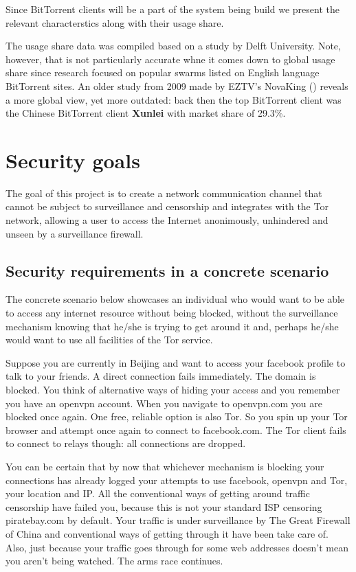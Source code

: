 \documentclass[11pt]{book} %
\begin{document}
Since BitTorrent clients will be a part of the system being build we present the relevant characterstics along with their usage share.

The usage share data was compiled based on a study by Delft University. Note, however, that is not particularly accurate whne it comes down to global usage share since research focused on popular swarms listed on English language BitTorrent sites. An older study from 2009 made by EZTV’s NovaKing (\citep*{web:oldbtUsage}) reveals a more global view, yet more outdated: back then the top BitTorrent client was the Chinese BitTorrent client \textbf{Xunlei} with market share of 29.3\%.

\newpage
\section{Security goals}
\label{sec:goals}

The goal of this project is to create a network communication channel that cannot be subject to surveillance and censorship and integrates with the Tor network, allowing a user to access the Internet anonimously, unhindered and unseen by a surveillance firewall.

\subsection{Security requirements in a concrete scenario}

The concrete scenario below showcases an individual who would want to be able to access any internet resource without being blocked, without the surveillance mechanism knowing that he/she is trying to get around it and, perhaps he/she would want to use all facilities of the Tor service.

Suppose you are currently in Beijing and want to access your facebook profile to talk to your friends. A direct connection fails immediately. The domain is blocked. You think of alternative ways of hiding your access and you remember you have an openvpn account. When you navigate to openvpn.com you are blocked once again. One free, reliable option is also Tor. So you spin up your Tor browser and attempt once again to connect to facebook.com. The Tor client fails to connect to relays though: all connections are dropped.  \citep*{web:blockedInChina}

You can be certain that by now that whichever mechanism is blocking your connections has already logged your attempts to use facebook, openvpn and Tor, your location and IP.  All the conventional ways of getting around traffic censorship have failed you, because this is not your standard ISP censoring piratebay.com by default. Your traffic is under surveillance by The Great Firewall of China and conventional ways of getting through it have been take care of. Also, just because your traffic goes through for some web addresses doesn't mean you aren't being watched. The arms race continues.
\end{document}
